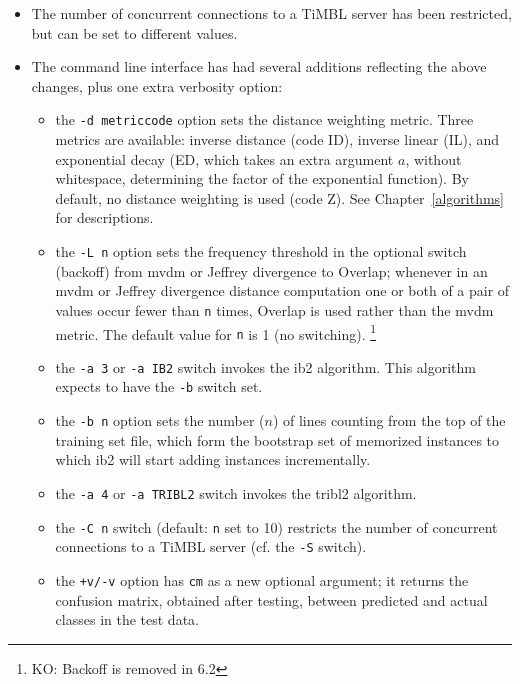 \documentclass{report}
\begin{document}
\begin{itemize}
\item The number of concurrent connections to a TiMBL server has been
restricted, but can be set to different values.

\item The command line interface has had several additions reflecting
the above changes, plus one extra verbosity option:

\begin{itemize} 
	\item the {\tt -d metriccode} option sets the distance
          weighting metric. Three metrics are available: inverse
          distance (code ID), inverse linear (IL), and exponential
          decay (ED, which takes an extra argument $a$, without
          whitespace, determining the factor of the exponential
          function). By default, no distance weighting is used (code
          Z). See Chapter~\ref{algorithms} for descriptions.
        \item the {\tt -L n} option sets the frequency threshold in
          the optional switch (backoff) from {\sc mvdm} or Jeffrey
          divergence to Overlap; whenever in an {\sc mvdm} or Jeffrey
          divergence distance computation one or both of a pair of
          values occur fewer than {\tt n} times, Overlap is used
          rather than the {\sc mvdm} metric.  The default value for
          {\tt n} is 1 (no switching). \footnote{KO: Backoff is removed in 6.2}
	\item the {\tt -a 3} or {\tt -a IB2} switch invokes the 
              {\sc ib2} algorithm. This algorithm expects to have 
              the {\tt -b} switch set.
	\item the {\tt -b n} option sets the number ($n$) of lines
              counting from the top of the training set file, which form
              the bootstrap set of memorized instances to which {\sc ib2} 
              will start adding instances incrementally.
	\item the {\tt -a 4} or {\tt -a TRIBL2} switch invokes the 
              {\sc tribl2} algorithm.
        \item the {\tt -C n} switch (default: {\tt n} set to 10) restricts
              the number of concurrent connections to a TiMBL server
              (cf. the {\tt -S} switch).
	\item the {\tt +v/-v} option has {\tt cm} as a new optional
              argument; it returns the confusion matrix, obtained
              after testing, between predicted and actual classes in 
              the test data.
\end{itemize}


\end{itemize}
\end{document}
